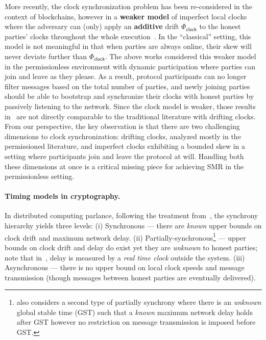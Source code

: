 More recently, the clock synchronization problem has been re-considered in the context of blockchains, however in a \textbf{weaker model} of imperfect local clocks where the adversary can (only) apply an \textbf{additive} drift $\varPhi_{\mathsf{clock}}$ to the honest parties' clocks throughout the whole execution~\cite{EC:BGKRZ21,TCC:GarKiaShe22}.
%
In the ``classical'' setting, this model is not meaningful in that when parties are always online, their skew will never deviate further than $\varPhi_{\mathsf{clock}}$.
%
The above works considered this weaker model in the permissionless environment with dynamic participation where parties can join and leave as they please.
%
As a result, protocol participants can no longer filter messages based on the total number of parties, and newly joining parties should be able to bootstrap and synchronize their clocks with honest parties by passively listening to the network.
%
Since the clock model is weaker, those results in~\cite{EC:BGKRZ21,TCC:GarKiaShe22} are not directly comparable to the traditional literature with drifting clocks.
%
From our perspective, the key observation is that there are two challenging dimensions to clock synchronization: drifting clocks, analyzed mostly in the permissioned literature, and imperfect clocks exhibiting a bounded skew in a setting where participants join and leave the protocol at will.
%
Handling both these dimensions at once is a critical missing piece for achieving SMR in the permissionless setting.

\paragraph{Timing models in cryptography.}
%
In distributed computing parlance, following the treatment from~\cite{JACM:DwoLynSto88}, the synchrony hierarchy yields three levels:
%
(i) Synchronous --- there are \emph{known} upper bounds on clock drift and maximum network delay.
%
(ii) Partially-synchronous\footnote{\cite{JACM:DwoLynSto88} also considers a second type of partially synchrony where there is an \emph{unknown} global stable time (GST) such that a \emph{known} maximum network delay holds after GST however no restriction on message transmission is imposed before GST.} --- upper bounds on clock drift and delay do exist yet they are \emph{unknown} to honest parties;
%
note that in~\cite{JACM:DwoLynSto88}, delay is measured by a \emph{real time clock} outside the system.
%
(iii) Asynchronous --- there is no upper bound on local clock speeds and message transmission (though messages between honest parties are eventually delivered).

